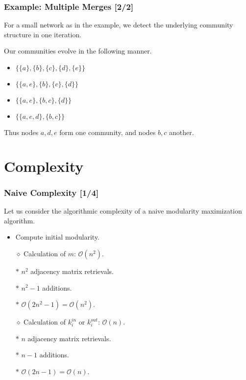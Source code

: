 \documentclass{beamer}
\begin{document}
\begin{frame}

    \frametitle{Example: Multiple Merges [2/2]}

    For a small network as in the example, we detect the underlying community structure in one iteration.\pause

    \vspace{2.5mm}
    Our communities evolve in the following manner.\pause

    \vspace{2.5mm}
    \begin{itemize}
        \item $ \{ \{a\}, \{b\}, \{c\}, \{d\}, \{e\} \}$\pause
        \item $ \{ \{a, e\}, \{b\}, \{c\}, \{d\} \}$\pause
        \item $ \{ \{a, e\}, \{b, c\}, \{d\} \}$\pause
        \item $ \{ \{a, e, d\}, \{b, c\} \}$\pause
    \end{itemize}

    \vspace{2.5mm}
    Thus nodes $ a, d, e $ form one community, and nodes $ b, c $ another. 

\end{frame}


\section{Complexity}

\begin{frame}

    \frametitle{Naive Complexity [1/4]}

    Let us consider the algorithmic complexity of a naive modularity maximization algorithm.\pause

    \vspace{2.5mm}
    \begin{itemize}
        \item Compute initial modularity.\pause
        \item[$\diamond$] Calculation of $ m $: $ \mathcal{O}(n^{2}) $.\pause
        \item[$\ast$] $ n^{2} $ adjacency matrix retrievals.\pause
        \item[$\ast$] $ n^{2} - 1 $ additions.\pause
        \item[$\ast$] $ \mathcal{O}(2n^{2} - 1) = \mathcal{O}(n^{2}) $.\pause
        \item[$\diamond$] Calculation of $ k_{i}^{in} $ or $ k_{i}^{out} $: $ \mathcal{O}(n) $.\pause
        \item[$\ast$] $ n $ adjacency matrix retrievals.\pause
        \item[$\ast$] $ n - 1 $ additions.\pause
        \item[$\ast$] $ \mathcal{O}(2n - 1) = \mathcal{O}(n) $. 
    \end{itemize}

\end{frame}
\end{document}
